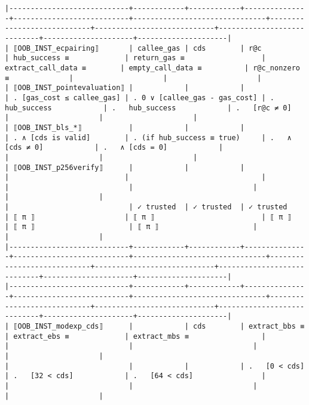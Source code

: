 \documentclass[varwidth=\maxdimen,margin=0.5cm,multi={verbatim}]{standalone}
\begin{document}
\begin{verbatim}
|----------------------------+------------+------------+---------------+---------------------------+-------------------------------+----------------------------+----------------------------+----------------------------+---------------------+---------------------|
| ⟦OOB_INST_ecpairing⟧       | callee_gas | cds        | r@c           | hub_success ≡             | return_gas ≡                  | extract_call_data ≡        | empty_call_data ≡          | r@c_nonzero ≡              |                     |                     |
| ⟦OOB_INST_pointevaluation⟧ |            |            |               | . [gas_cost ≤ callee_gas] | . 0 ∨ [callee_gas - gas_cost] | .   hub_success            | .   hub_success            | .   [r@c ≠ 0]              |                     |                     |
| ⟦OOB_INST_bls_*⟧           |            |            |               | . ∧ [cds is valid]        | . (if hub_success ≡ true)     | .   ∧ [cds ≠ 0]            | .   ∧ [cds = 0]            |                            |                     |                     |
| ⟦OOB_INST_p256verify⟧      |            |            |               |                           |                               |                            |                            |                            |                     |                     |
|                            | ✓ trusted  | ✓ trusted  | ✓ trusted     | ⟦ π ⟧                     | ⟦ π ⟧                         | ⟦ π ⟧                      | ⟦ π ⟧                      | ⟦ π ⟧                      |                     |                     |
|----------------------------+------------+------------+---------------+---------------------------+-------------------------------+----------------------------+----------------------------+----------------------------+---------------------+---------------------|
|----------------------------+------------+------------+---------------+---------------------------+-------------------------------+----------------------------+----------------------------+----------------------------+---------------------+---------------------|
| ⟦OOB_INST_modexp_cds⟧      |            | cds        | extract_bbs ≡ | extract_ebs ≡             | extract_mbs ≡                 |                            |                            |                            |                     |                     |
|                            |            |            | .   [0 < cds] | .   [32 < cds]            | .   [64 < cds]                |                            |                            |                            |                     |                     |

\end{verbatim}
\end{document}
